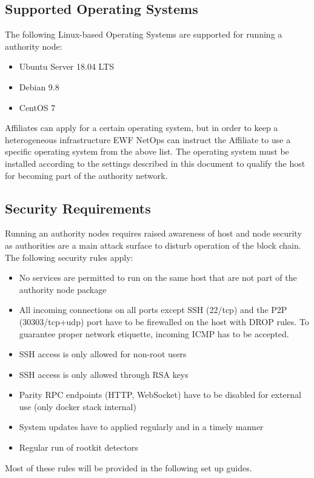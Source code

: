\subsection{Supported Operating Systems}

The following Linux-based Operating Systems are supported for running a authority node: 

\begin{itemize}
    \item Ubuntu Server 18.04 LTS
    \item Debian 9.8
    \item CentOS 7
\end{itemize}

Affiliates can apply for a certain operating system, but in order to keep a heterogeneous infrastructure EWF NetOps can instruct the Affiliate to use a specific operating system from the above list. 
The operating system must be installed according to the settings described in this document to qualify the host for becoming part of the authority network.


\subsection{Security Requirements}

Running an authority nodes requires raised awareness of host and node security as authorities are a main attack surface to disturb operation of the block chain.
The following security rules apply:

\begin{itemize}
    \item No services are permitted to run on the same host that are not part of the authority node package
    \item All incoming connections on all ports except SSH (22/tcp) and the P2P (30303/tcp+udp) port have to be firewalled on the host with DROP rules. To guarantee proper network etiquette, incoming ICMP has to be accepted.
    \item SSH access is only allowed for non-root users
    \item SSH access is only allowed through RSA keys
    \item Parity RPC endpoints (HTTP, WebSocket) have to be disabled for external use (only docker stack internal)
    \item System updates have to applied regularly and in a timely manner
    \item Regular run of rootkit detectors
\end{itemize}

Most of these rules will be provided in the following set up guides.
